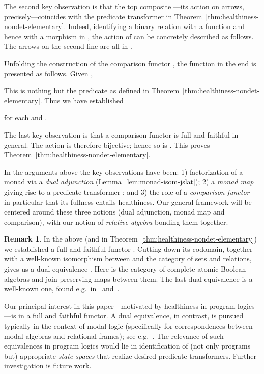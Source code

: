 \documentclass[9pt, preprint]{sigplanconf}
\theoremstyle{theorem}
\theoremstyle{definition}
\newtheorem{remark}[theorem]{Remark}
\begin{document}
The second key observation is that
 the top composite
---its action on arrows, precisely---coincides
 with the predicate transformer  in
 Theorem~\ref{thm:healthiness-nondet-elementary}.
 Indeed, identifying a binary relation  with
 a function  and hence with
 a morphism  in , the action of  can
 be concretely described as follows. The arrows on the second line are all
 in .

Unfolding the construction of the comparison functor , the function
 in the end is presented as follows.
Given ,

This is nothing but the predicate  as
defined in Theorem~\ref{thm:healthiness-nondet-elementary}. Thus we have
established

for each  and .

The last key observation is that
 a comparison functor is full and faithful
in general.   The action  is therefore bijective;
 hence so is .
This proves Theorem~\ref{thm:healthiness-nondet-elementary}.


In the arguments above the key observations have been: 1) factorization of
a monad via a \emph{dual adjunction} (Lemma~\ref{lem:monad-isom-jslat});
2) a \emph{monad map}  giving rise to a predicate transformer
; and 3) the role of a \emph{comparison
functor} ---in particular that its fullness entails healthiness.
Our general framework will be centered around these three notions (dual
adjunction, monad map and comparison), with our notion of \emph{relative
algebra} bonding them together.


\begin{remark}\label{rem:CABA}
In the above (and in Theorem~\ref{thm:healthiness-nondet-elementary}) we
 established a full and faithful functor .  Cutting down its codomain, together with a
 well-known isomorphism between  and the category  of
 sets and relations, gives us a dual equivalence . Here  is the
 category of complete atomic Boolean algebras and join-preserving maps
 between them. The last dual equivalence is a well-known one, found
 e.g.\ in~\cite[Section~II.9]{Halmos06} and~\cite{JonssonT51}.

 Our principal interest in this paper---motivated by healthiness in
 program logics---is in a full and faithful functor. A dual equivalence,
 in contrast, is pursued typically in the context of modal logic
 (specifically for correspondences between modal algebras and relational
 frames); see e.g.~\cite{HofmannN15}. The relevance of such equivalences
 in program logics would lie in identification of (not only programs
 but) appropriate \emph{state spaces} that realize desired predicate
 transformers. Further investigation is future work.
\end{remark}
\end{document}
